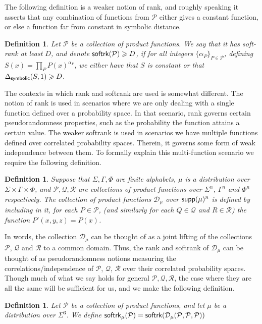 \documentclass[11pt]{article}
\newtheorem{definition}[thm]{Definition}
\renewcommand\geq{\geqslant}
\begin{document}
The following definition is a weaker notion of rank, and roughly speaking it asserts that any combination of functions from $\mathcal{P}$ either gives a constant function, or else a function far from constant in symbolic distance.
\begin{definition}\label{def:softrank}
    Let $\mathcal{P}$ be a collection of product functions. We say that it has soft-rank at least $D$, and denote ${\sf softrk}(\mathcal{P})\geq D$, if for all integers $\{\alpha_P\}_{P\in\mathcal{P}}$, defining $S(x) = \prod\limits_{P}P(x)^{\alpha_P}$, we either have that $S$ is constant or that
    $\Delta_{{\sf symbolic}}(S,1)\geq D$.
\end{definition}

The contexts in which rank and softrank are used is somewhat different. The notion of rank is used in scenarios where we are only dealing with a single function defined over a probability space. In that scenario, rank governs certain pseudorandomness properties, such as the probability the function attains a certain value. The weaker softrank is used in scenarios we have multiple functions defined over correlated probability spaces. Therein, it governs some form of weak independence between them. To formally explain this multi-function scenario we require the following definition.
\begin{definition}\label{def:tensor_of_collecitions}
    Suppose that $\Sigma,\Gamma,\Phi$ are finite alphabets, $\mu$ is a distribution over $\Sigma\times\Gamma\times \Phi$, and $\mathcal{P},\mathcal{Q},\mathcal{R}$ are collections of product functions over $\Sigma^n$, $\Gamma^n$ and $\Phi^n$ respectively. The collection of product functions $\mathcal{D}_{\mu}$ over ${\sf supp}(\mu)^n$ is defined by including in it, for each $P\in \mathcal{P}$, 
    (and similarly for each $Q\in \mathcal{Q}$ and $R\in\mathcal{R}$)  
    the function $P'(x,y,z) = P(x)$. 
\end{definition}
In words, the collection $\mathcal{D}_{\mu}$ can be thought of as a joint lifting of the collections $\mathcal{P}$, $\mathcal{Q}$ and $\mathcal{R}$ to a common domain. Thus, the rank and softrank of $\mathcal{D}_{\mu}$ can be thought of as pseudorandomness notions measuring the correlations/independence of $\mathcal{P}$, $\mathcal{Q}$, $\mathcal{R}$ over their correlated probability spaces. Though much of what we say holds for general $\mathcal{P},\mathcal{Q},\mathcal{R}$, the case where they are all the same will be sufficient for us, and we make the following definition.
\begin{definition}
    Let $\mathcal{P}$ be a collection of product functions, and let $\mu$ be a distribution over $\Sigma^3$. We define ${\sf softrk}_{\mu}(\mathcal{P}) = {\sf softrk}(\mathcal{D}_{\mu}(\mathcal{P},\mathcal{P},\mathcal{P}))$
\end{definition}
\end{document}
